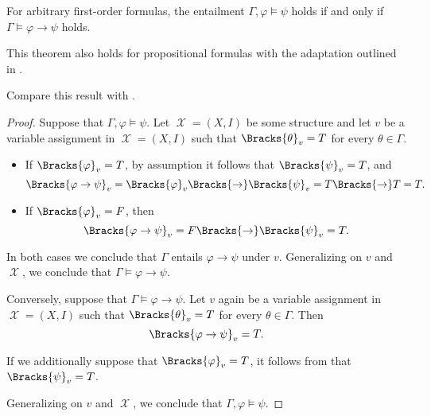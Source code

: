 \begin{theorem}\label{thm:semantic_deduction_theorem}
  For arbitrary first-order formulas, the entailment \( \Gamma, \varphi \vDash \psi \) holds if and only if \( \Gamma \vDash \varphi \to \psi \) holds.
\end{theorem}
\begin{comments}
  \item This theorem also holds for propositional formulas with the adaptation outlined in .
  \item Compare this result with .
\end{comments}
\begin{proof}
  \SufficiencySubProof Suppose that \( \Gamma, \varphi \vDash \psi \). Let \( \mscrX = (X, I) \) be some structure and let \( v \) be a variable assignment in \( \mscrX = (X, I) \) such that \( \Bracks{\theta}_v = T \) for every \( \theta \in \Gamma \).

  \begin{itemize}
    \item If \( \Bracks{\varphi}_v = T \), by assumption it follows that \( \Bracks{\psi}_v = T \), and
    \begin{equation*}
      \Bracks{\varphi \rightarrow \psi}_v
      =
      \Bracks{\varphi}_v \Bracks{\rightarrow} \Bracks{\psi}_v
      =
      T \Bracks{\rightarrow} T
      =
      T.
    \end{equation*}

    \item If \( \Bracks{\varphi}_v = F \), then
    \begin{equation*}
      \Bracks{\varphi \rightarrow \psi}_v
      =
      F \Bracks{\rightarrow} \Bracks{\psi}_v
      =
      T.
    \end{equation*}
  \end{itemize}

  In both cases we conclude that \( \Gamma \) entails \( \varphi \rightarrow \psi \) under \( v \). Generalizing on \( v \) and \( \mscrX \), we conclude that \( \Gamma \vDash \varphi \rightarrow \psi \).

  \NecessitySubProof Conversely, suppose that \( \Gamma \vDash \varphi \rightarrow \psi \). Let \( v \) again be a variable assignment in \( \mscrX = (X, I) \) such that \( \Bracks{\theta}_v = T \) for every \( \theta \in \Gamma \). Then
  \begin{equation*}
    \Bracks{\varphi \rightarrow \psi}_v = T.
  \end{equation*}

  If we additionally suppose that \( \Bracks{\varphi}_v = T \), it follows from  that \( \Bracks{\psi}_v = T \).

  Generalizing on \( v \) and \( \mscrX \), we conclude that \( \Gamma, \varphi \vDash \psi \).
\end{proof}
